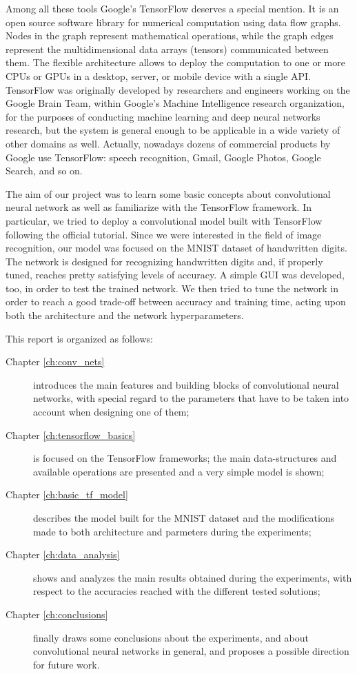 Among all these tools Google's TensorFlow deserves a special mention.  It is an open source software library for numerical computation using data flow graphs. Nodes in the graph represent mathematical operations, while the graph edges represent the multidimensional data arrays (tensors) communicated between them. The flexible architecture allows to deploy the computation to one or more \acsp{CPU} or \acsp{GPU} in a desktop, server, or mobile device with a single \acs{API}. TensorFlow was originally developed by researchers and engineers working on the Google Brain Team, within Google's Machine Intelligence research organization, for the purposes of conducting machine learning and deep neural networks research, but the system is general enough to be applicable in a wide variety of other domains as well. Actually, nowadays dozens of commercial products by Google use TensorFlow: speech recognition, Gmail, Google Photos, Google Search, and so on.

The aim of our project was to learn some basic concepts about convolutional neural network as well as familiarize with the TensorFlow framework. In particular, we tried to deploy a convolutional model built with TensorFlow following the official tutorial. Since we were interested in the field of image recognition, our model was focused on the MNIST dataset of handwritten digits. The network is designed for recognizing handwritten digits and, if properly tuned, reaches pretty satisfying levels of accuracy. A simple \ac{GUI} was developed, too, in order to test the trained network. We then tried to tune the network in order to reach a good trade-off between accuracy and training time, acting upon both the architecture and the network hyperparameters.

This report is organized as follows:

\begin{description}
	
	\item[Chapter \ref{ch:conv_nets}] introduces the main features and building blocks of convolutional neural networks, with special regard to the parameters that have to be taken into account when designing one of them;
	
	\item[Chapter \ref{ch:tensorflow_basics}] is focused on the TensorFlow frameworks; the main data-structures and available operations are presented and a very simple model is shown;
	
	\item[Chapter \ref{ch:basic_tf_model}] describes the model built for the MNIST dataset and the modifications made to both architecture and parmeters during the experiments;
	
	\item[Chapter \ref{ch:data_analysis}] shows and analyzes the main results obtained during the experiments, with respect to the accuracies reached with the different tested solutions;
	
	\item[Chapter \ref{ch:conclusions}] finally draws some conclusions about the experiments, and about convolutional neural networks in general, and proposes a possible direction for future work.
	
\end{description}